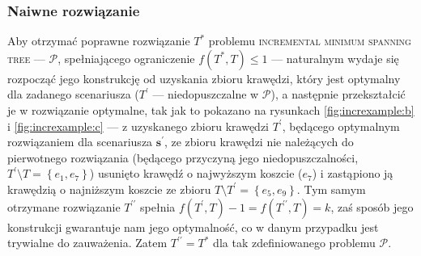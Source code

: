 \subsubsection{Naiwne rozwiązanie}

Aby otrzymać poprawne rozwiązanie $T^{\ast}$ problemu \textsc{incremental minimum spanning tree} --- $\mathcal{P}$, spełniającego ograniczenie $f \left( T^{\ast}, T \right) \leqslant 1$ --- naturalnym wydaje się rozpocząć jego konstrukcję od uzyskania zbioru krawędzi, który jest optymalny dla zadanego scenariusza ($T^{\prime}$ --- niedopuszczalne w $\mathcal{P}$), a następnie przekształcić je w rozwiązanie optymalne, tak jak to pokazano na rysunkach \ref{fig:increxample:b} i \ref{fig:increxample:c} --- z uzyskanego zbioru krawędzi $T^{\prime}$, będącego optymalnym rozwiązaniem dla scenariusza $\textbf{s}^{\prime}$, ze zbioru krawędzi nie należących do pierwotnego rozwiązania (będącego przyczyną jego niedopuszczalności, $T^{\prime} \setminus T = \left\{ e_{1}, e_{7} \right\}$) usunięto krawędź o najwyższym koszcie ($e_{7}$) i zastąpiono ją krawędzią o najniższym koszcie ze zbioru $T \setminus T^{\prime} = \left\{ e_{5}, e_{9} \right\}$. Tym samym otrzymane rozwiązanie $T^{\prime\prime}$ spełnia $f \left( T^{\prime}, T \right) - 1 = f \left( T^{\prime\prime}, T \right) = k$, zaś sposób jego konstrukcji gwarantuje nam jego optymalność, co w danym przypadku jest trywialne do zauważenia. Zatem $T^{\prime\prime} = T^{\ast}$ dla tak zdefiniowanego problemu $\mathcal{P}$.


